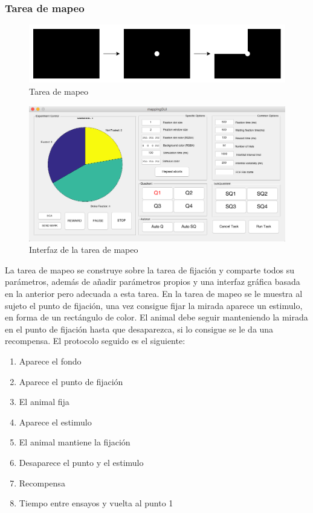 \documentclass[conference]{IEEEtran}
\begin{document}
\subsubsection*{Tarea de mapeo}

\begin{figure}[htbp]
\centerline{\includegraphics[width=\linewidth]{figures/mapping_task}}
\caption{Tarea de mapeo}
\label{figMapTask}
\end{figure}

\begin{figure}[htbp]
\centerline{\includegraphics[width=\linewidth]{figures/mapping_gui}}
\caption{Interfaz de la tarea de mapeo}
\label{figmappingGUI}
\end{figure}

La tarea de mapeo se construye sobre la tarea de fijación y comparte todos su parámetros, además de añadir parámetros propios y una interfaz gráfica basada en la anterior pero adecuada a esta tarea.
En la tarea de mapeo se le muestra al sujeto el punto de fijación, una vez consigue fijar la mirada aparece un estimulo, en forma de un rectángulo de color. El animal debe seguir manteniendo la mirada en el punto de fijación hasta que desaparezca, si lo consigue se le da una recompensa.
El protocolo seguido es el siguiente:

\begin{enumerate}
	\item Aparece el fondo
	\item Aparece el punto de fijación
	\item El animal fija
	\item Aparece el estimulo
	\item El animal mantiene la fijación
	\item Desaparece el punto y el estimulo
	\item Recompensa
	\item Tiempo entre ensayos y vuelta al punto 1
\end{enumerate}
\end{document}

